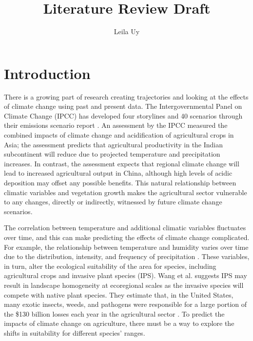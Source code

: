 \documentclass[a4paper,10pt]{article}
\title{Literature Review Draft}
\author{Leila Uy}
\begin{document}
\maketitle

% 

\section{Introduction}

There is a growing part of research creating trajectories and looking at the effects of climate change using past and present data. The Intergovernmental Panel on Climate Change (IPCC) has developed four storylines and 40 scenarios through their emissions scenario report \cite{IPCC2000emissions}.  An assessment by the IPCC measured the combined impacts of climate change and acidification of agricultural crops in Asia; the assessment predicts that agricultural productivity in the Indian subcontinent will reduce due to projected temperature and precipitation increases. In contrast, the assessment expects that regional climate change will lead to increased agricultural output in China, although high levels of acidic deposition may offset any possible benefits. This natural relationship between climatic variables and vegetation growth makes the agricultural sector vulnerable to any changes, directly or indirectly, witnessed by future climate change scenarios. 

The correlation between temperature and additional climatic variables fluctuates over time, and this can make predicting the effects of climate change complicated. For example, the relationship between temperature and humidity varies over time due to the distribution, intensity, and frequency of precipitation \cite{peng2017economic}. These variables, in turn, alter the ecological suitability of the area for species, including agricultural crops and invasive plant species (IPS). Wang et al. \cite{wang2019potential} suggests IPS  may result in landscape homogeneity at ecoregional scales as the invasive species will compete with native plant species. They estimate that, in the United States, many exotic insects, weeds, and pathogens were responsible for a large portion of the \$130 billion losses each year in the agricultural sector \cite{carruthers2003invasive}. To predict the impacts of climate change on agriculture, there must be a way to explore the shifts in suitability for different species' ranges. 
\end{document}
